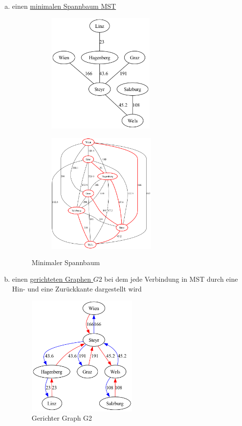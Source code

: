 \documentclass[a4paper,11pt]{report}
\begin{document}
    \begin{enumerate}[a)]
        \item einen \hyperref[fig:a04_mst_and_highlight]{minimalen Spannbaum MST}
        \begin{figure}[htbp]
            \centering
            \begin{subfigure}[b]{0.3\textwidth}
                \includegraphics[height=6cm]{a04a_mst}
                \label{fig:a04_mst}
            \end{subfigure}
            \begin{subfigure}[b]{0.3\textwidth}
                \includegraphics[height=6cm]{a04a_graph_highlighted}
                \label{fig:a04_graph_highlighted}
            \end{subfigure}
            \caption{Minimaler Spannbaum}
            \label{fig:a04_mst_and_highlight}
        \end{figure}

        \item einen \hyperref[fig:a04_g2]{gerichteten Graphen $G2$} bei dem jede Verbindung in MST durch eine Hin- und
        eine Zurückkante dargestellt wird
        \begin{figure}[htbp]
            \centering
            \includegraphics[height=6cm]{a04a_g2}
            \caption{Gerichter Graph G2}
            \label{fig:a04_g2}
        \end{figure}


\end{enumerate}
\end{document}
